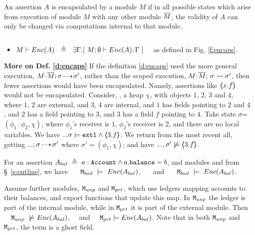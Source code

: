 {An assertion $A$  is  encapsulated by a module $M$  if in all possible states which arise from execution of module $M$ with any other  module $\overline{M}$, the validity of $A$}  {can only be changed via computations internal to that module}.
 

\begin{definition} $~$ \\
\label{d:encaps:sytactic}
\begin{itemize}
\item 
$M \vdash \encaps{A}  \ \   \triangleq  \ \  \exists \Gamma.[\ M; \emptyset \vdash \encaps{A}; \Gamma\ ]$ \ \  as defined in Fig. \ref{f:encaps}.
 \end{itemize}
  \end{definition}
  


\noindent
\textbf{More on Def. \ref{d:encaps}} {If the definition \ref{d:encaps} used the more general execution, $M\!\cdot\!\overline{M};\sigma\! \dashrightarrow\! {\sigma'}$, rather than the scoped execution,  $M\!\cdot\!\overline{M};\, {\sigma} \rightsquigarrow \sigma'$, then fewer assertions would have been encapsulated.}
Namely, assertions like    $\langle\!\!\langle x.f \rangle\!\!\rangle$ would not be encapsulated.
Consider, \eg, a heap $\chi$, with objects $1$, $2$, $3$ and $4$, where  $1$, $2$ are external, and $3$, $4$ are internal, and  $1$ has fields pointing to $2$ and $4$, and $2$ has a field pointing to $3$, and $3$ has a field $f$ pointing to $4$. Take  state $\sigma$=$(\phi_1\!\cdot\!\phi_2,\chi)$, where $\phi_1$'s receiver is $1$,  $\phi_2$'s receiver is $2$,   and there are no local variables. 
We have  $...\sigma\models \mbox{\normalfont{\texttt{extl}}} \wedge \langle\!\!\langle 3.f \rangle\!\!\rangle$. 
We  return from the most recent all, 
getting  $...;\sigma\! \dashrightarrow\! {\sigma'}$ where $\sigma'=(\phi_1,\chi)$; and have   $...,\sigma'\not\models  \langle\!\!\langle 3.f \rangle\!\!\rangle$.

\begin{example}
\label{ex:not:encaps}
For an assertion $A_{bal}\  \triangleq\ a:\prg{Account}\wedge a.\prg{balance}=b$, %
and modules \ModB and  \ModC  from \S~\ref{s:outline}, we have  \ \ \ $\mbox{\normalfont{\texttt{M}}}_{{bad}}\ \models\ {Enc(  A_{bal}  )}$, \ \ \ and \ \ \ $\mbox{\normalfont{\texttt{M}}}_{{bad}}\ \models\ {Enc(  A_{bal}  )}$.
\end{example}


\begin{example} Assume   further modules, $\mbox{\normalfont{\texttt{M}}}_{{unp}}$ and $\mbox{\normalfont{\texttt{M}}}_{{prt}}$,  which  use ledgers mapping  accounts to their balances, and export functions that update this map. In  $\mbox{\normalfont{\texttt{M}}}_{{unp}}$ the ledger is  part of the {internal} module, %
while in $\mbox{\normalfont{\texttt{M}}}_{{prt}}$ it is part of the  {external} module.
Then  \ \ $\ModD \ \not\models\encaps{ A_{bal}} $, \ \  and \ \ $\mbox{\normalfont{\texttt{M}}}_{{prt}}  \models {\ensuremath Enc(  A_{bal} )} $.
Note that in both $\mbox{\normalfont{\texttt{M}}}_{{unp}}$ and $\mbox{\normalfont{\texttt{M}}}_{{prt}}$, the term  is a ghost field. 
\end{example}

